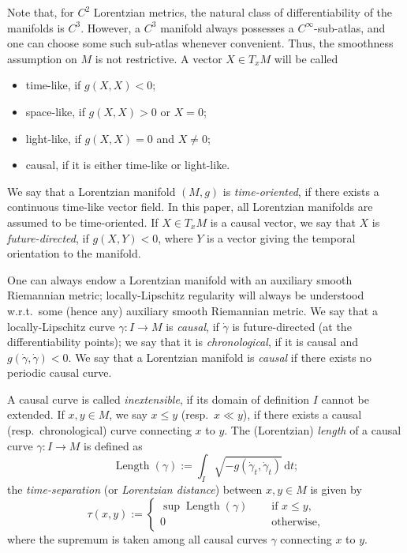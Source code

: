 \documentclass[12pt,a4paper]{amsart}
\theoremstyle{plain}
\theoremstyle{definition}
\numberwithin{equation}{section}
\DeclareMathOperator{\Length}{Length}
\newcommand{\de}{{\mathrm{d}}}
\begin{document}
Note that, for $C^{2}$ Lorentzian metrics, the natural class of differentiability of the manifolds is $C^{3}$. However, a $C^{3}$ manifold always possesses a $C^{\infty}$-sub-atlas, and one can choose some such sub-atlas whenever convenient. Thus, the smoothness assumption on $M$ is not restrictive.
%
A vector $X\in T_xM$ will be called
\begin{itemize}
\item
  time-like, if $g(X,X)<0$;
\item
  space-like, if $g(X,X)>0$ or $X=0$;
\item
  light-like, if $g(X,X)=0$ and $X\neq 0$;
\item
  causal, if it is either time-like or light-like.
\end{itemize}
%
We say that a Lorentzian manifold $(M,g)$ is \emph{time-oriented}, if there
exists a continuous time-like vector field. 
%
In this paper, all Lorentzian manifolds are assumed to be time-oriented.
%
If $X\in T_xM$ is a causal vector, we say that $X$ is \emph{future-directed},
if $g(X,Y)<0$, where $Y$ is a vector giving the temporal orientation to
the manifold.

One can always endow a Lorentzian manifold with an auxiliary smooth
Riemannian metric; locally-Lipschitz regularity will always be understood w.r.t.\ some (hence any) auxiliary smooth Riemannian metric.
%
We say that a locally-Lipschitz curve $\gamma:I\to M$ is
\emph{causal}, if $\dot\gamma$ is future-directed (at the differentiability points); we say that it is
\emph{chronological}, if it is causal and $g(\dot\gamma,\dot\gamma)<0$. We say that a Lorentzian manifold is \emph{causal} if there exists no periodic
causal curve.

%
A causal curve is called \emph{inextensible}, if its domain of definition $I$
cannot be extended.
%
If $x,y\in M$, we say $x\leq y$ (resp.\ $x\ll y$), if there exists a
causal (resp.\ chronological) curve connecting $x$ to $y$.
%
The (Lorentzian) \emph{length} of a causal curve $\gamma:I\to M$ is defined as
\begin{equation}
  \Length(\gamma)
  :=
  \int_I
  \sqrt{-g(\dot\gamma_t,\dot\gamma_t)}
  \,
  \de t;
\end{equation}
the \emph{time-separation} (or \emph{Lorentzian distance}) between $x, y\in M$ is given by
\begin{equation}
  \tau(x,y)
  :=
  \begin{cases}
    \sup
    \Length(\gamma)
    \quad&
           \text{ if } x\leq y,
    \\
    0
    &\text{ otherwise},
  \end{cases}
\end{equation}
where the supremum is taken among all causal curves $\gamma$ connecting $x$ to $y$.
\end{document}
